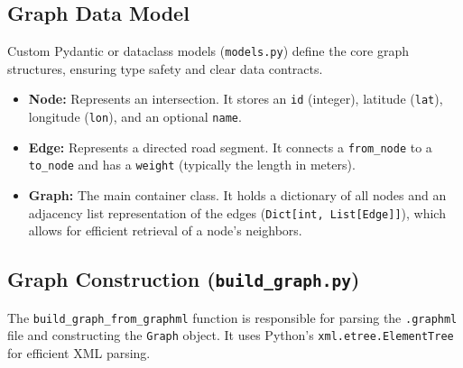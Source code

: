 \documentclass[12pt, a4paper]{report}
\begin{document}
\subsection{Graph Data Model}
Custom Pydantic or dataclass models (\texttt{models.py}) define the core graph structures, ensuring type safety and clear data contracts.
\begin{itemize}
    \item \textbf{Node:} Represents an intersection. It stores an \texttt{id} (integer), latitude (\texttt{lat}), longitude (\texttt{lon}), and an optional \texttt{name}.
    \item \textbf{Edge:} Represents a directed road segment. It connects a \texttt{from\_node} to a \texttt{to\_node} and has a \texttt{weight} (typically the length in meters).
    \item \textbf{Graph:} The main container class. It holds a dictionary of all nodes and an adjacency list representation of the edges (\texttt{Dict[int, List[Edge]]}), which allows for efficient retrieval of a node's neighbors.
\end{itemize}

\subsection{Graph Construction (\texttt{build\_graph.py})}
The \texttt{build\_graph\_from\_graphml} function is responsible for parsing the \texttt{.graphml} file and constructing the \texttt{Graph} object. It uses Python's \texttt{xml.etree.ElementTree} for efficient XML parsing.
\end{document}

